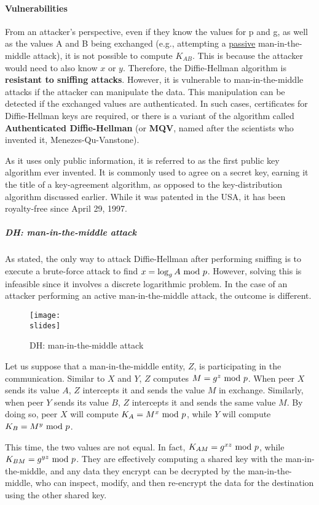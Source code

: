 \paragraph{Vulnerabilities}
From an attacker's perspective, even if they know the values for p and g, as well as the values A and B being exchanged (e.g., attempting a \underline{passive} man-in-the-middle attack), it is not possible to compute $K_{AB}$.
This is because the attacker would need to also know $x$ or $y$.
Therefore, the Diffie-Hellman algorithm is \textbf{resistant to sniffing attacks}.
However, it is vulnerable to man-in-the-middle attacks if the attacker can manipulate the data.
This manipulation can be detected if the exchanged values are authenticated. In such cases, certificates for Diffie-Hellman keys are required, or there is a variant of the algorithm called \textbf{Authenticated Diffie-Hellman} (or \textbf{MQV}, named after the scientists who invented it, Menezes-Qu-Vanstone).

As it uses only public information, it is referred to as the first public key algorithm ever invented. It is commonly used to agree on a secret key, earning it the title of a key-agreement algorithm, as opposed to the key-distribution algorithm discussed earlier. While it was patented in the USA, it has been royalty-free since April 29, 1997.

\subparagraph{DH: man-in-the-middle attack}
As stated, the only way to attack Diffie-Hellman after performing sniffing is to execute a brute-force attack to find \(x = \log_{g} A \text{ mod } p\). However, solving this is infeasible since it involves a discrete logarithmic problem. In the case of an attacker performing an active man-in-the-middle attack, the outcome is different.
\begin{figure}[h]
    \centering
    \texttt{[image: \\slides]}
    \caption{DH: man-in-the-middle attack}
    \label{fig:DH_mitm}
\end{figure}

Let us suppose that a man-in-the-middle entity, $Z$, is participating in the communication. Similar to $X$ and $Y$, $Z$ computes $M = g^z \text{ mod } p$. When peer $X$ sends its value $A$, $Z$ intercepts it and sends the value $M$ in exchange. Similarly, when peer $Y$ sends its value $B$, $Z$ intercepts it and sends the same value $M$. By doing so, peer $X$ will compute $K_A = M^x \text{ mod } p$, while $Y$ will compute $K_B = M^y \text{ mod } p$.

This time, the two values are not equal. In fact, $K_{AM} = g^{xz} \text{ mod } p$, while $K_{BM} = g^{yz} \text{ mod } p$. They are effectively computing a shared key with the man-in-the-middle, and any data they encrypt can be decrypted by the man-in-the-middle, who can inspect, modify, and then re-encrypt the data for the destination using the other shared key.


